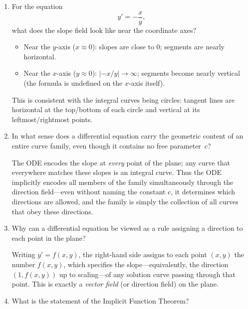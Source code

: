 \documentclass{self-check}
\begin{document}
\begin{enumerate}[leftmargin=*, itemsep=8pt]
  \item For the equation \[ y'=-\frac{x}{y}, \] what does the slope
    field look like near the coordinate axes?

    \begin{answer}
      \begin{itemize}
        \item Near the $y$-axis ($x\approx 0$): slopes are close to
          $0$; segments are nearly horizontal.
        \item Near the $x$-axis ($y\approx 0$): $|{-x/y}|\to\infty$;
          segments become nearly vertical (the formula is undefined on
          the $x$-axis itself).
      \end{itemize}
      This is consistent with the integral curves being circles:
      tangent lines are horizontal at the top/bottom of each circle and
      vertical at its leftmost/rightmost points.
    \end{answer}

  \item In what sense does a differential equation carry the
    geometric content of an entire curve family, even though it
    contains no free parameter~$c$?

    \begin{answer} The ODE encodes the slope at \emph{every} point
      of the plane; any curve that everywhere matches these slopes is
      an integral curve.  Thus the ODE implicitly encodes all members
      of the family simultaneously through the direction field---even
      without naming the constant $c$, it determines which directions
      are allowed, and the family is simply the collection of all
      curves that obey these directions.
    \end{answer}

  \item Why can a differential equation be viewed as a rule assigning
    a direction to each point in the plane?

    \begin{answer} Writing $y'=f(x,y)$, the right-hand side assigns
      to each point $(x,y)$ the number $f(x,y)$, which specifies the
      slope---equivalently, the direction $(1, f(x,y))$ up to
      scaling---of any solution curve passing through that point.  This
      is exactly a \emph{vector field} (or direction field) on the plane.
    \end{answer}

  \item What is the statement of the Implicit Function Theorem?


\end{enumerate}
\end{document}
